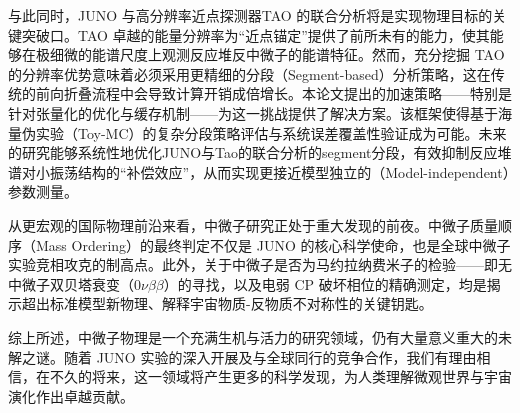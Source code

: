 与此同时，JUNO 与高分辨率近点探测器TAO 的联合分析将是实现物理目标的关键突破口。TAO 卓越的能量分辨率为“近点锚定”提供了前所未有的能力，使其能够在极细微的能谱尺度上观测反应堆反中微子的能谱特征。然而，充分挖掘 TAO 的分辨率优势意味着必须采用更精细的分段（Segment-based）分析策略，这在传统的前向折叠流程中会导致计算开销成倍增长。本论文提出的加速策略——特别是针对张量化的优化与缓存机制——为这一挑战提供了解决方案。该框架使得基于海量伪实验（Toy-MC）的复杂分段策略评估与系统误差覆盖性验证成为可能。未来的研究能够系统性地优化JUNO与Tao的联合分析的segment分段，有效抑制反应堆谱对小振荡结构的“补偿效应”，从而实现更接近模型独立的（Model-independent）参数测量。

从更宏观的国际物理前沿来看，中微子研究正处于重大发现的前夜。中微子质量顺序（Mass Ordering）的最终判定不仅是 JUNO 的核心科学使命，也是全球中微子实验竞相攻克的制高点。此外，关于中微子是否为马约拉纳费米子的检验——即无中微子双贝塔衰变（$0\nu\beta\beta$）的寻找，以及电弱 CP 破坏相位的精确测定，均是揭示超出标准模型新物理、解释宇宙物质-反物质不对称性的关键钥匙。

综上所述，中微子物理是一个充满生机与活力的研究领域，仍有大量意义重大的未解之谜。随着 JUNO 实验的深入开展及与全球同行的竞争合作，我们有理由相信，在不久的将来，这一领域将产生更多的科学发现，为人类理解微观世界与宇宙演化作出卓越贡献。
